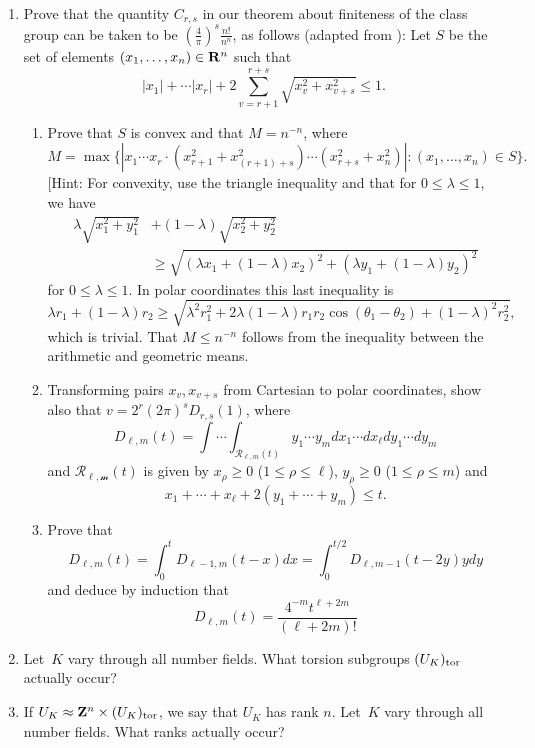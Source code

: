 \begin{enumerate}
\item Prove that the quantity $C_{r,s}$ in our theorem about finiteness
of the class group can be taken to be $\left(\frac{4}{\pi}\right)^{s} \frac{n!}{n^n}$, as follows (adapted from \cite[pg.~19]{sd:brief}):
Let $S$ be the set of elements
$(x_1,\ldots, x_{n})\in\mathbf{R}^n$ such that
$$
  |x_1| + \cdots |x_{r}| + 2 \sum_{v=r+1}^{r+s}
                    \sqrt{x_v^2 + x_{v+s}^2} \leq 1.
$$
\begin{enumerate}
\item 
Prove that $S$ is convex and that $M=n^{-n}$,
where 
$$
  M = \max\{ |x_1\cdots x_r\cdot (x_{r+1}^2 + x_{(r+1)+s}^2)\cdots (x_{r+s}^2 + x_n^2)| : (x_1,\ldots, x_n) \in S\}.
$$
[Hint: For convexity, use the triangle inequality and
that for $0\leq \lambda \leq 1$, we have
\begin{align*}
\lambda\sqrt{x_1^2 + y_1^2} &+ (1-\lambda)\sqrt{x_2^2+y_2^2}\\
&\geq\sqrt{(\lambda x_1 + (1-\lambda)x_2)^2 + 
(\lambda y_1 + (1-\lambda)y_2)^2}
\end{align*}
for $0\leq \lambda \leq 1$.  In polar coordinates this last inequality
is 
$$
  \lambda r_1 + (1-\lambda)r_2 \geq 
   \sqrt{\lambda^2 r_1^2 + 2\lambda(1-\lambda) r_1 r_2 \cos(\theta_1 - \theta_2) + (1-\lambda)^2 r_2^2},
$$
which is trivial.  That $M\leq n^{-n}$ follows from the inequality
between the arithmetic and geometric means.
\item Transforming pairs $x_v, x_{v+s}$ from Cartesian to polar coordinates,
show also that $v=2^{r}(2\pi)^s D_{r,s}(1)$, where
$$
  D_{\ell,m}(t) = \int \cdots \int_{\mathcal{R}_{\ell,m}(t)}
       y_1 \cdots y_m dx_1 \cdots dx_{\ell} dy_1 \cdots dy_m
$$
and 
$\mathcal{R_{\ell,m}}(t)$ is given by $x_{\rho}\geq 0$
($1\leq \rho\leq \ell$), $y_{\rho}\geq 0$
($1\leq \rho\leq m$) and 
$$
  x_1 + \cdots + x_{\ell} + 2(y_1+\cdots +y_m) \leq t.
$$
\item Prove that
$$
  D_{\ell,m}(t) = \int_{0}^t D_{\ell-1,m}(t-x)dx
     =\int_{0}^{t/2} D_{\ell,m-1}(t-2y)y dy
$$
and deduce by induction that 
$$
  D_{\ell,m}(t) = \frac{4^{-m}t^{\ell+2m}}{(\ell+2m)!}
$$
\end{enumerate}


\item Let~$K$ vary through all number fields.  What torsion
subgroups $(U_K)_{\operatorname{tor}}$ actually occur?

\item If 
$U_K \approx \mathbf{Z}^n \times (U_K)_{\operatorname{tor}}$, we say that $U_K$
has rank $n$.  Let~$K$ vary through all number fields.  
What ranks actually occur?


\end{enumerate}
